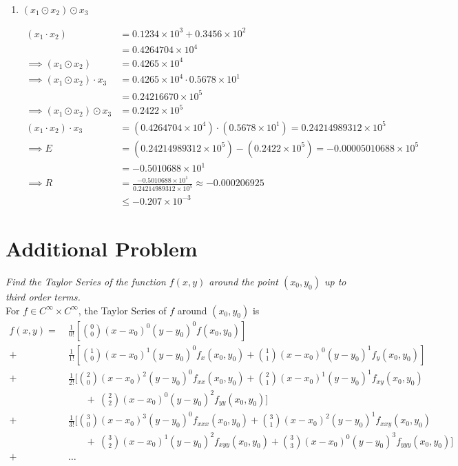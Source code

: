 \documentclass[12pt]{article}
\begin{document}
\begin{enumerate}[\ \ (a)\ \ ]
\item $(x_1 \odot x_2) \odot x_3$
\begin{align*}
(x_1 \cdot x_2) &= 0.1234 \times 10^3 + 0.3456 \times 10^2 \\
&= 0.4264704 \times 10^4 \\
\implies (x_1 \odot x_2) &= 0.4265 \times 10^4 \\
\implies (x_1 \odot x_2) \cdot x_3 &= 0.4265 \times 10^4 \cdot 0.5678 \times 10^1 \\
&= 0.24216670 \times 10^5 \\
\implies (x_1 \odot x_2) \odot x_3 &= \boxed{0.2422 \times 10^5} \\
(x_1 \cdot x_2) \cdot x_3 &= (0.4264704 \times 10^4) \cdot (0.5678 \times 10^1) = 0.24214989312 \times 10^5 \\
\implies E &= (0.24214989312 \times 10^5) - (0.2422 \times 10^5) = -0.00005010688 \times 10^5 \\
&= \boxed{-0.5010688 \times 10^{1}} \\
\implies R &= \frac{-0.5010688 \times 10^{1}}{0.24214989312 \times 10^5} \approx -0.000206925 \\
&\leq \boxed{-0.207 \times 10^{-3}}
\end{align*}

\end{enumerate}

\pagebreak
\section*{Additional Problem}
{\it Find the Taylor Series of the function $f(x,y)$ around the point $(x_0, y_0)$ up to third order terms.} \\

\noindent For $f \in C^{\infty}\times C^{\infty}$, the Taylor Series of $f$ around $(x_0, y_0)$ is
\begin{align*}
f(x, y) = \ &\frac{1}{0!}\left[\binom{0}{0}(x - x_0)^{0}(y - y_0)^{0}f(x_0, y_0)\right] \\
+ \ &\frac{1}{1!}\left[\binom{1}{0}(x - x_0)^{1}(y - y_0)^{0}f_x(x_0, y_0) + \binom{1}{1}(x - x_0)^{0}(y - y_0)^{1}f_y(x_0, y_0)\right] \\
+ \ &\frac{1}{2!}\Bigg[\binom{2}{0}(x - x_0)^{2}(y - y_0)^{0}f_{xx}(x_0, y_0) + \binom{2}{1}(x - x_0)^{1}(y - y_0)^{1}f_{xy}(x_0, y_0) \\
& \ \ \ \ \ \ \ \ + \ \binom{2}{2}(x - x_0)^{0}(y - y_0)^{2}f_{yy}(x_0, y_0)\Bigg] \\
+ \ &\frac{1}{3!}\Bigg[\binom{3}{0}(x - x_0)^{3}(y - y_0)^{0}f_{xxx}(x_0, y_0) + \binom{3}{1}(x - x_0)^{2}(y - y_0)^{1}f_{xxy}(x_0, y_0) \\
& \ \ \ \ \ \ \ \ + \ \binom{3}{2}(x - x_0)^{1}(y - y_0)^{2}f_{xyy}(x_0, y_0) + \binom{3}{3}(x - x_0)^{0}(y - y_0)^{3}f_{yyy}(x_0, y_0)\Bigg] \\
+ &\dots
\end{align*}
\end{document}
